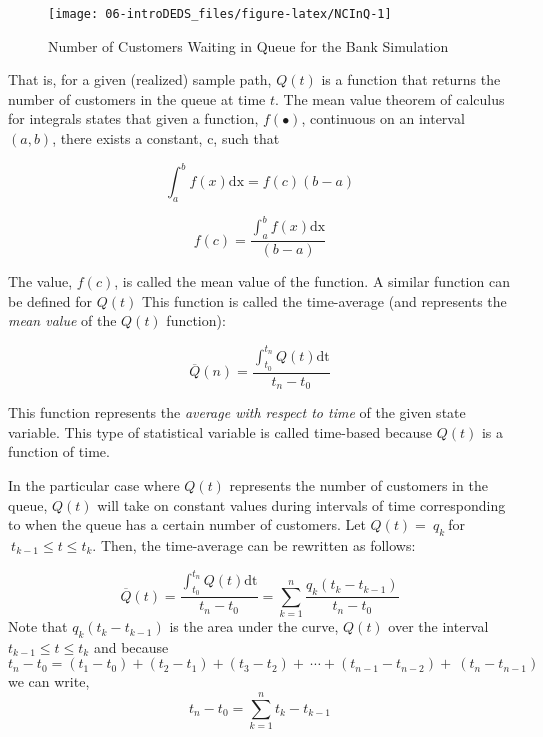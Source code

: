 \documentclass[
]{book}
\theoremstyle{definition}
\theoremstyle{definition}
\theoremstyle{definition}
\theoremstyle{definition}
\theoremstyle{remark}
\begin{document}
\begin{figure}

{\centering \texttt{[image: 06-introDEDS\_files/figure-latex/NCInQ-1]} 

}

\caption{Number of Customers Waiting in Queue for the Bank Simulation}\label{fig:NCInQ}
\end{figure}

That is, for a given (realized) sample path, \(Q(t)\) is a function that
returns the number of customers in the queue at time \(t\). The mean value
theorem of calculus for integrals states that given a function,
\(f( \bullet )\), continuous on an interval \((a, b)\), there exists a
constant, c, such that

\[\int_{a}^{b}{f\left( x \right)\text{dx}} = f(c)(b - a)\]

\[f\left( c \right) = \frac{\int_{a}^{b}{f\left( x \right)\text{dx}}}{(b - a)}\]

The value, \(f(c)\), is called the mean value of the function. A similar
function can be defined for \(Q(t)\) This function is called the
time-average (and represents the \emph{mean value} of the \(Q(t)\)
function):

\[\overline{Q}\left( n \right) = \frac{\int_{t_{0}}^{t_{n}}{Q\left( t \right)\text{dt}}}{t_{n} - t_{0}}\]

This function represents the \emph{average with respect to time} of the given
state variable. This type of statistical variable is called time-based
because \(Q(t)\) is a function of time.

In the particular case where \(Q(t)\) represents the number of customers
in the queue, \(Q(t)\) will take on constant values during intervals of
time corresponding to when the queue has a certain number of customers. Let \(Q\left( t \right) = \ q_{k}\ \)for\(\ t_{k - 1} \leq t \leq t_{k}\). Then, the time-average can be rewritten as follows:

\[\overline{Q}\left( t \right) = \frac{\int_{t_{0}}^{t_{n}}{Q\left( t \right)\text{dt}}}{t_{n} - t_{0}} = \sum_{k = 1}^{n}\frac{q_{k}(t_{k} - t_{k - 1})}{t_{n} - t_{0}}\]
Note that \(q_{k}(t_{k} - t_{k - 1})\) is the area under the curve, \(Q\left( t \right)\) over the interval \(t_{k - 1} \leq t \leq t_{k}\) and because \[t_{n} - t_{0} = \left( t_{1} - t_{0} \right) + \left( t_{2} - t_{1} \right) + \left( t_{3} - t_{2} \right) + \ \cdots + \left( t_{n - 1} - t_{n - 2} \right) + \ \left( t_{n} - t_{n - 1} \right)\]
we can write,
\[t_{n} - t_{0} = \sum_{k = 1}^{n}{t_{k} - t_{k - 1}}\]
\end{document}

